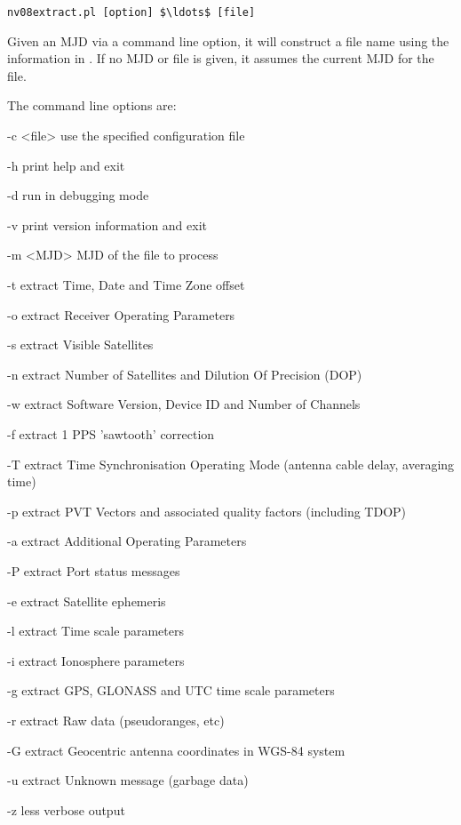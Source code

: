 \begin{lstlisting}[mathescape=true]
nv08extract.pl [option] $\ldots$ [file]
\end{lstlisting}

Given an MJD via a command line option, it will construct a file name using the information in . If no MJD or file is given, it assumes the current MJD for the file. 

The command line options are:
\begin{description*}
	\item[-c \textless{file}\textgreater] use the specified configuration file
	\item[-h] print help and exit
	\item[-d] run in debugging mode
	\item[-v] print version information and exit
	\item[-m \textless{MJD}\textgreater]  MJD of the file to process
	\item[-t] extract Time, Date and Time Zone offset
	\item[-o] extract Receiver Operating Parameters
	\item[-s] extract Visible Satellites
	\item[-n] extract Number of Satellites and Dilution Of Precision (DOP)
	\item[-w] extract Software Version, Device ID and Number of Channels
	\item[-f] extract 1 PPS 'sawtooth' correction
	\item[-T] extract Time Synchronisation Operating Mode (antenna cable delay, averaging time)
	\item[-p] extract PVT Vectors and associated quality factors (including TDOP)
	\item[-a] extract Additional Operating Parameters
	\item[-P] extract Port status messages
	\item[-e] extract Satellite ephemeris
	\item[-l] extract Time scale parameters
	\item[-i] extract Ionosphere parameters
	\item[-g] extract GPS, GLONASS and UTC time scale parameters
	\item[-r] extract Raw data (pseudoranges, etc)
	\item[-G] extract Geocentric antenna coordinates in WGS-84 system
	\item[-u] extract Unknown message (garbage data)
	\item[-z] less verbose output
\end{description*}

